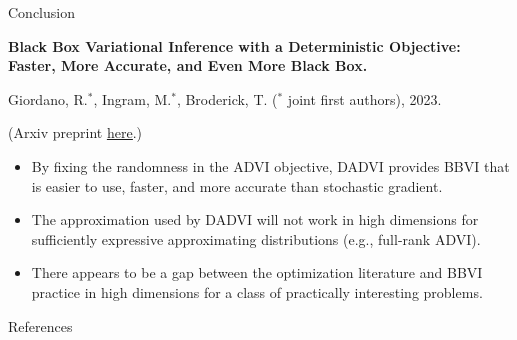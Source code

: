 \documentclass[8pt]{beamer}\usepackage[]{graphicx}\usepackage[]{color}
\begin{document}
\begin{frame}{Conclusion}


\textbf{Black Box Variational Inference with a Deterministic
Objective: Faster, More Accurate, and Even More Black Box.}

Giordano, R.$^*$, Ingram, M.$^*$, Broderick, T.
($^*$ joint first authors), 2023.

(Arxiv preprint \href{https://arxiv.org/pdf/2304.05527.pdf}{\underline{here}}.)

\vspace{2em}
%
\begin{itemize}
    \item By fixing the randomness in the ADVI objective, DADVI provides 
        BBVI that is easier to use, faster, and more accurate than stochastic gradient.
    \item The approximation used by DADVI will not work in high dimensions
        for sufficiently expressive approximating distributions (e.g., 
        full-rank ADVI).
    \item There appears to be a gap between the optimization literature and 
        BBVI practice in high dimensions for a class of practically interesting
        problems.
\end{itemize}
%



\end{frame}



\begin{frame}{References}

    \footnotesize
    
    
    \begingroup
    \renewcommand{\section}[2]{}%
    
    \endgroup
    
\end{frame}
    
\end{document}
